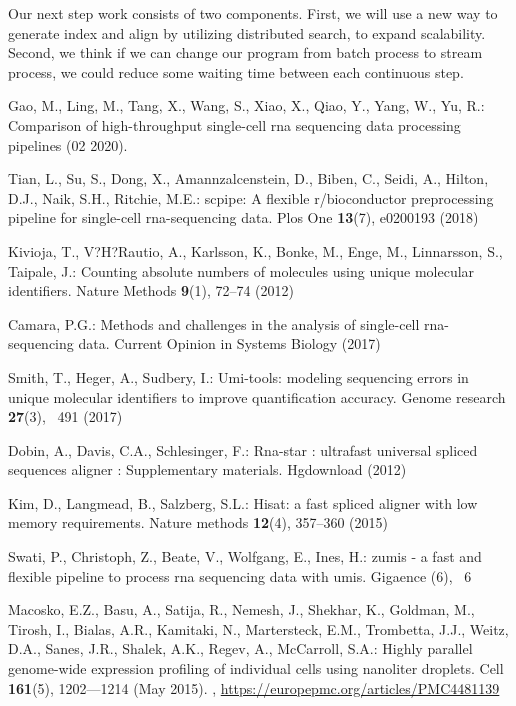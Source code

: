 \documentclass[runningheads]{llncs}
\begin{document}
Our next step work consists of two components.
First, we will use a new way to generate index and align by utilizing distributed search, to expand scalability.
Second, we think if we can change our program from batch process to stream process, we could reduce some waiting time between each continuous step.
\begin{thebibliography}{8}

%
%

Gao, M., Ling, M., Tang, X., Wang, S., Xiao, X., Qiao, Y., Yang, W., Yu, R.:
Comparison of high-throughput single-cell rna sequencing data processing
pipelines  (02 2020). 

Tian, L., Su, S., Dong, X., Amannzalcenstein, D., Biben, C., Seidi, A., Hilton,
D.J., Naik, S.H., Ritchie, M.E.: scpipe: A flexible r/bioconductor
preprocessing pipeline for single-cell rna-sequencing data. Plos One
\textbf{13}(7),  e0200193 (2018)

Kivioja, T., V?H?Rautio, A., Karlsson, K., Bonke, M., Enge, M., Linnarsson, S.,
Taipale, J.: Counting absolute numbers of molecules using unique molecular
identifiers. Nature Methods  \textbf{9}(1),  72--74 (2012)

Camara, P.G.: Methods and challenges in the analysis of single-cell
rna-sequencing data. Current Opinion in Systems Biology  (2017)

Smith, T., Heger, A., Sudbery, I.: Umi-tools: modeling sequencing errors in
unique molecular identifiers to improve quantification accuracy. Genome
research  \textbf{27}(3), ~491 (2017)

Dobin, A., Davis, C.A., Schlesinger, F.: Rna-star : ultrafast universal spliced
sequences aligner : Supplementary materials. Hgdownload  (2012)

Kim, D., Langmead, B., Salzberg, S.L.: Hisat: a fast spliced aligner with low
memory requirements. Nature methods  \textbf{12}(4),  357--360 (2015)

Swati, P., Christoph, Z., Beate, V., Wolfgang, E., Ines, H.: zumis - a fast and
flexible pipeline to process rna sequencing data with umis. Gigaence (6), ~6

Macosko, E.Z., Basu, A., Satija, R., Nemesh, J., Shekhar, K., Goldman, M.,
Tirosh, I., Bialas, A.R., Kamitaki, N., Martersteck, E.M., Trombetta, J.J.,
Weitz, D.A., Sanes, J.R., Shalek, A.K., Regev, A., McCarroll, S.A.: Highly
parallel genome-wide expression profiling of individual cells using nanoliter
droplets. Cell  \textbf{161}(5),  1202—1214 (May 2015).
,
\url{https://europepmc.org/articles/PMC4481139}


\end{thebibliography}
\end{document}

